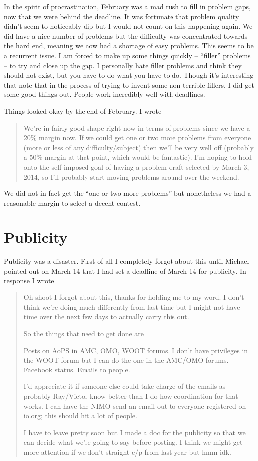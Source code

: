 \documentclass[11pt]{scrreprt}
\begin{document}
In the spirit of procrastination, February was a mad rush to fill in problem gaps,
now that we were behind the deadline.
It was fortunate that problem quality didn't seem to noticeably dip but I would not count
on this happening again.
We did have a nice number of problems but the difficulty was concentrated towards the hard end,
meaning we now had a shortage of easy problems.
This seems to be a recurrent issue.
I am forced to make up some things quickly -- ``filler'' problems -- to try and close up the gap.
I personally hate filler problems and think they should not exist, but you have to do what you have to do.
Though it's interesting that note that in the process of trying to invent some non-terrible fillers,
I did get some good things out.
People work incredibly well with deadlines.

Things looked okay by the end of February. I wrote
\begin{quote}
  We're in fairly good shape right now in terms of problems since we have a 20\% margin now. If we could get one or two more problems from everyone (more or less of any difficulty/subject) then we'll be very well off (probably a 50\% margin at that point, which would be fantastic). I'm hoping to hold onto the self-imposed goal of having a problem draft selected by March 3, 2014, so I'll probably start moving problems around over the weekend.
\end{quote}
We did not in fact get the ``one or two more problems'' but nonetheless we had a reasonable margin to select a decent contest.

\section{Publicity}
Publicity was a disaster.
First of all I completely forgot about this until Michael pointed out on March 14
that I had set a deadline of March 14 for publicity.
In response I wrote
\begin{quote}
Oh shoot I forgot about this, thanks for holding me to my word. I don't think we're doing much differently from last time but I might not have time over the next few days to actually carry this out.

So the things that need to get done are

\begin{itemize}
  \ii Posts on AoPS in AMC, OMO, WOOT forums. I don't have privileges in the WOOT forum but I can do the one in the AMC/OMO forums.
    \ii Facebook status.
    \ii Emails to people.
\end{itemize}

I'd appreciate it if someone else could take charge of the emails as probably Ray/Victor know better than I do how coordination for that works.  I can have the NIMO send an email out to everyone registered on io.org; this should hit a lot of people.

I have to leave pretty soon but I made a doc for the publicity so that we can decide what we're going to say before posting. I think we might get more attention if we don't straight c/p from last year but hmm idk.
\end{quote}
\end{document}
